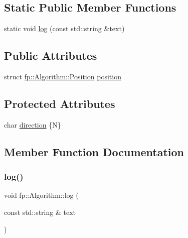 \subsection*{Static Public Member Functions}
\begin{DoxyCompactItemize}
\item 
static void \hyperlink{classfp_1_1_algorithm_ad8d891300bf2a5be160a629a93e7058d}{log} (const std\+::string \&text)
\end{DoxyCompactItemize}
\subsection*{Public Attributes}
\begin{DoxyCompactItemize}
\item 
struct \hyperlink{structfp_1_1_algorithm_1_1_position}{fp\+::\+Algorithm\+::\+Position} \hyperlink{classfp_1_1_algorithm_a841339b57c3d2739325f3f421ada43b6}{position}
\end{DoxyCompactItemize}
\subsection*{Protected Attributes}
\begin{DoxyCompactItemize}
\item 
char \hyperlink{classfp_1_1_algorithm_afdbf632b658aea1aef75caa90e60a8fc}{direction} \{\textquotesingle{}N\textquotesingle{}\}
\end{DoxyCompactItemize}


\subsection{Member Function Documentation}
\mbox{\label{classfp_1_1_algorithm_ad8d891300bf2a5be160a629a93e7058d}} 
\subsubsection{\texorpdfstring{log()}{log()}}
{\footnotesize\ttfamily void fp\+::\+Algorithm\+::log (\begin{DoxyParamCaption}\item[{const std\+::string \&}]{text }\end{DoxyParamCaption})\hspace{0.3cm}{\ttfamily [static]}}

